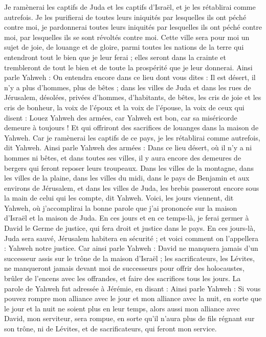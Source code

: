 \begin{multicols}{2}
Je ramènerai les captifs de Juda et les captifs d'Israël, et je les rétablirai comme autrefois.
Je les purifierai de toutes leurs iniquités par lesquelles ils ont péché contre moi, je pardonnerai toutes leurs iniquités par lesquelles ils ont péché contre moi, par lesquelles ils se sont révoltés contre moi.
Cette ville sera pour moi un sujet de joie, de louange et de gloire, parmi toutes les nations de la terre qui entendront tout le bien que je leur ferai ; elles seront dans la crainte et trembleront de tout le bien et de toute la prospérité que je leur donnerai.
Ainsi parle Yahweh : On entendra encore dans ce lieu dont vous dites : Il est désert, il n'y a plus d'hommes, plus de bêtes ; dans les villes de Juda et dans les rues de Jérusalem, désolées, privées d'hommes, d'habitants, de bêtes,
les cris de joie et les cris de bonheur, la voix de l'époux et la voix de l'épouse, la voix de ceux qui disent : Louez Yahweh des armées, car Yahweh est bon, car sa miséricorde demeure à toujours ! Et qui offriront des sacrifices de louanges dans la maison de Yahweh. Car je ramènerai les captifs de ce pays, je les rétablirai comme autrefois, dit Yahweh.
Ainsi parle Yahweh des armées : Dans ce lieu désert, où il n'y a ni hommes ni bêtes, et dans toutes ses villes, il y aura encore des demeures de bergers qui feront reposer leurs troupeaux.
Dans les villes de la montagne, dans les villes de la plaine, dans les villes du midi, dans le pays de Benjamin et aux environs de Jérusalem, et dans les villes de Juda, les brebis passeront encore sous la main de celui qui les compte, dit Yahweh.
Voici, les jours viennent, dit Yahweh, où j'accomplirai la bonne parole que j'ai prononcée sur la maison d'Israël et la maison de Juda.
En ces jours et en ce temps-là, je ferai germer à David le Germe de justice, qui fera droit et justice dans le pays.
En ces jours-là, Juda sera sauvé, Jérusalem habitera en sécurité ; et voici comment on l'appellera : Yahweh notre justice.
Car ainsi parle Yahweh : David ne manquera jamais d'un successeur assis sur le trône de la maison d'Israël ;
les sacrificateurs, les Lévites, ne manqueront jamais devant moi de successeurs pour offrir des holocaustes, brûler de l'encens avec les offrandes, et faire des sacrifices tous les jours.
La parole de Yahweh fut adressée à Jérémie, en disant :
Ainsi parle Yahweh : Si vous pouvez rompre mon alliance avec le jour et mon alliance avec la nuit, en sorte que le jour et la nuit ne soient plus en leur temps,
alors aussi mon alliance avec David, mon serviteur, sera rompue, en sorte qu'il n'aura plus de fils régnant sur son trône, ni de Lévites, et de sacrificateurs, qui feront mon service.

\end{multicols}
